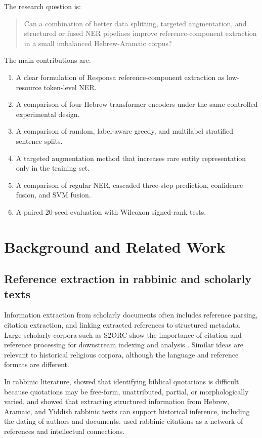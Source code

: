 \documentclass[12pt,a4paper]{report}
\begin{document}
The research question is:
\begin{quote}
Can a combination of better data splitting, targeted augmentation, and structured or fused NER pipelines improve reference-component extraction in a small imbalanced Hebrew-Aramaic corpus?
\end{quote}

The main contributions are:
\begin{enumerate}[leftmargin=*]
\item A clear formulation of Responsa reference-component extraction as low-resource token-level NER.
\item A comparison of four Hebrew transformer encoders under the same controlled experimental design.
\item A comparison of random, label-aware greedy, and multilabel stratified sentence splits.
\item A targeted augmentation method that increases rare entity representation only in the training set.
\item A comparison of regular NER, cascaded three-step prediction, confidence fusion, and SVM fusion.
\item A paired 20-seed evaluation with Wilcoxon signed-rank tests.
\end{enumerate}

\chapter{Background and Related Work}
\section{Reference extraction in rabbinic and scholarly texts}
Information extraction from scholarly documents often includes reference parsing, citation extraction, and linking extracted references to structured metadata. Large scholarly corpora such as S2ORC show the importance of citation and reference processing for downstream indexing and analysis \citep{lo2020s2orc}. Similar ideas are relevant to historical religious corpora, although the language and reference formats are different.

In rabbinic literature, \citet{hacohen2010} showed that identifying biblical quotations is difficult because quotations may be free-form, unattributed, partial, or morphologically varied. \citet{mughaz2014} and \citet{moghaz2019} showed that extracting structured information from Hebrew, Aramaic, and Yiddish rabbinic texts can support historical inference, including the dating of authors and documents. \citet{satlow2022} used rabbinic citations as a network of references and intellectual connections.
\end{document}
